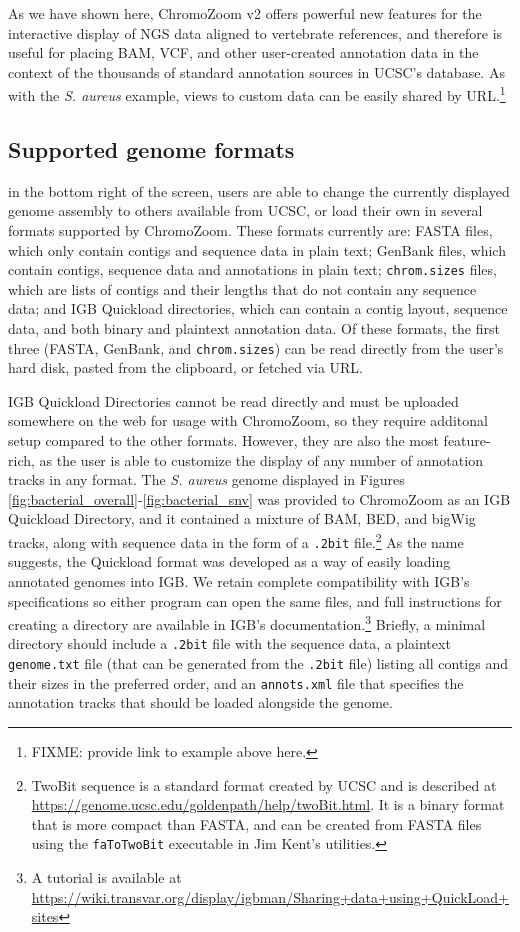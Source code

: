 As we have shown here, ChromoZoom v2 offers powerful new features for the interactive display of NGS data aligned to vertebrate references, and therefore is useful for placing BAM, VCF, and other user-created annotation data in the context of the thousands of standard annotation sources in UCSC's database. As with the \emph{S. aureus} example, views to custom data can be easily shared by URL.\footnote{FIXME: provide link to example above here.}

\subsection{Supported genome formats}

 in the bottom right of the screen, users are able to change the currently displayed genome assembly to others available from UCSC, or load their own in several formats supported by ChromoZoom. These formats currently are: FASTA files, which only contain contigs and sequence data in plain text; GenBank files, which contain contigs, sequence data and annotations in plain text; \texttt{chrom.sizes} files, which are lists of contigs and their lengths that do not contain any sequence data; and IGB Quickload directories, which can contain a contig layout, sequence data, and both binary and plaintext annotation data. Of these formats, the first three (FASTA, GenBank, and \texttt{chrom.sizes}) can be read directly from the user's hard disk, pasted from the clipboard, or fetched via URL.

IGB Quickload Directories cannot be read directly and must be uploaded somewhere on the web for usage with ChromoZoom, so they require additonal setup compared to the other formats. However, they are also the most feature-rich, as the user is able to customize the display of any number of annotation tracks in any format. The \emph{S. aureus} genome displayed in Figures \ref{fig:bacterial_overall}-\ref{fig:bacterial_snv} was provided to ChromoZoom as an IGB Quickload Directory, and it contained a mixture of BAM, BED, and bigWig tracks, along with sequence data in the form of a \texttt{.2bit} file.\footnote{TwoBit sequence is a standard format created by UCSC and is described at \url{https://genome.ucsc.edu/goldenpath/help/twoBit.html}. It is a binary format that is more compact than FASTA, and can be created from FASTA files using the \texttt{faToTwoBit} executable in Jim Kent's utilities.} As the name suggests, the Quickload format was developed as a way of easily loading annotated genomes into IGB. We retain complete compatibility with IGB's specifications so either program can open the same files, and full instructions for creating a directory are available in IGB's documentation.\footnote{A tutorial is available at \url{https://wiki.transvar.org/display/igbman/Sharing+data+using+QuickLoad+sites}} Briefly, a minimal directory should include a \texttt{.2bit} file with the sequence data, a plaintext \texttt{genome.txt} file (that can be generated from the \texttt{.2bit} file) listing all contigs and their sizes in the preferred order, and an \texttt{annots.xml} file that specifies the annotation tracks that should be loaded alongside the genome.

